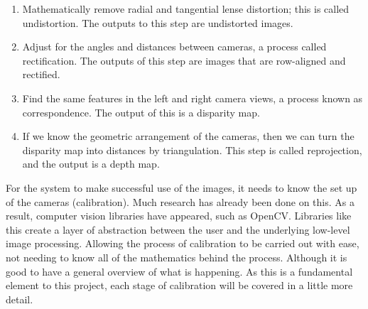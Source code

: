 \documentclass[11pt,oneside]{report}
\begin{document}
			\begin{enumerate}
				\item Mathematically remove radial and tangential lense distortion; this is called undistortion. The outputs to this step are undistorted images.
				
				\item Adjust for the angles and distances between cameras, a process called rectification. The outputs of this step are images that are row-aligned and rectified.
				
				\item Find the same features in the left and right camera views, a process known as correspondence. The output of this is a disparity map.
								
				\item If we know the geometric arrangement of the cameras, then we can turn the disparity map into distances by triangulation. This step is called reprojection, and the output is a depth map.
			\end{enumerate}
			
			For the system to make successful use of the images, it needs to know the set up of the cameras (calibration).
			Much research has already been done on this.
			As a result, computer vision libraries have appeared, such as OpenCV.
			Libraries like this create a layer of abstraction between the user and the underlying low-level image processing.
			Allowing the process of calibration to be carried out with ease, not needing to know all of the mathematics behind the process.
			Although it is good to have a general overview of what is happening.
			As this is a fundamental element to this project, each stage of calibration will be covered in a little more detail.
\end{document}
